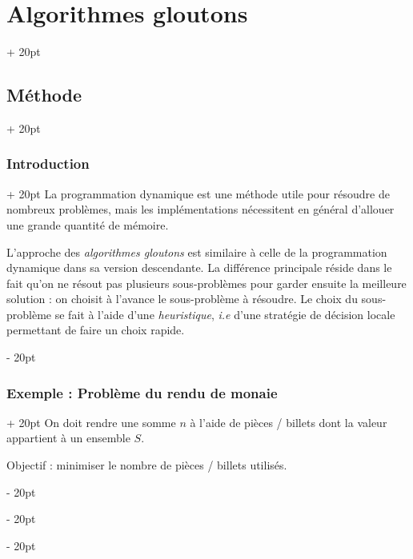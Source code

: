 \documentclass[a4paper, 12pt, twoside]{article}
\newcommand{\ind}[1][20pt]{\advance\leftskip + #1}
\newcommand{\deind}[1][20pt]{\advance\leftskip - #1}
\newenvironment{indt}[2][20pt]{#2 \par \ind[#1]}{\par \deind} %
\begin{document}
    \vspace{12pt}
    
    \begin{indt}{\section{Algorithmes gloutons}}
        
        \label{4}
        
        \begin{indt}{\subsection{Méthode}}
            \begin{indt}{\subsubsection{Introduction}}
                La programmation dynamique est une méthode utile pour résoudre de nombreux problèmes, mais les implémentations nécessitent en général d'allouer une grande quantité de mémoire.
                
                L'approche des \textit{algorithmes gloutons} est similaire à celle de la programmation dynamique dans sa version descendante.
                La différence principale réside dans le fait qu'on ne résout pas plusieurs sous-problèmes pour garder ensuite la meilleure solution : on choisit à l'avance le sous-problème à résoudre.
                Le choix du sous-problème se fait à l'aide d'une \textit{heuristique}, \textit{i.e} d'une stratégie de décision locale permettant de faire un choix rapide.
            \end{indt}
            
            \vspace{12pt}
            
            \begin{indt}{\subsubsection{Exemple : Problème du rendu de monaie}}
                On doit rendre une somme $n$ à l'aide de pièces / billets dont la valeur appartient à un ensemble $S$.
                
                Objectif : minimiser le nombre de pièces / billets utilisés.
                
                \vspace{12pt}
                

\end{indt}
\end{indt}
\end{indt}
\end{document}
